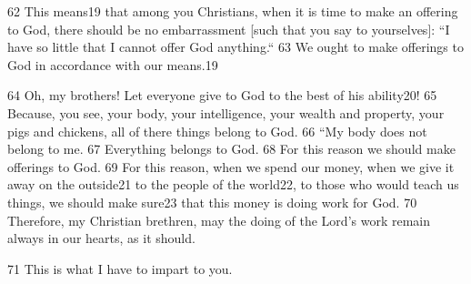 62 This means19 that among you Christians, when it is time to make an offering
to God, there should be no embarrassment [such that you say to yourselves]: ``I
have so little that I cannot offer God anything.`` 63 We ought to make
offerings to God in accordance with our means.19

64 Oh, my brothers! Let everyone give to God to the best of his ability20! 65 Because,
you see, your body, your intelligence, your wealth and property, your pigs and
chickens, all of there things belong to God. 66 ``My body does not belong
to me. 67 Everything belongs to God. 68 For this reason we should make offerings
to God. 69 For this reason, when we spend our money, when we give it away on the
outside21 to the people of the world22, to those who would teach us things, we
should make sure23 that this money is doing work for God. 70 Therefore, my Christian
brethren, may the doing of the Lord's work remain always in our hearts, as it should.

71 This is what I have to impart to you.

